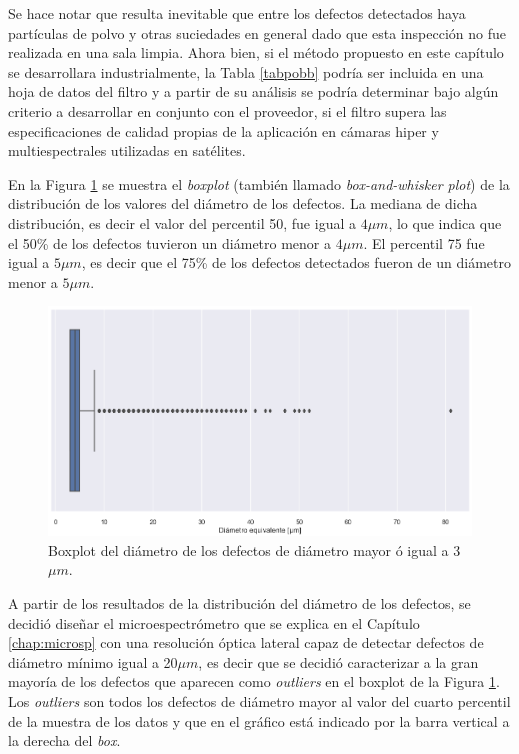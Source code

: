 Se hace notar que resulta inevitable que entre los defectos detectados haya partículas de polvo y otras suciedades en general dado que esta inspección no fue realizada en una sala limpia.  Ahora bien, si el método propuesto en este capítulo se desarrollara industrialmente, la Tabla \ref{tabpobb} podría ser incluida en una hoja de datos del filtro y a partir de su análisis se podría determinar bajo algún criterio a desarrollar en conjunto con el proveedor, si el filtro supera las especificaciones de calidad propias de la aplicación en cámaras hiper y multiespectrales utilizadas en satélites. 

En la Figura \ref{fig:boxpl} se muestra el \textit{boxplot} (también llamado \textit{box-and-whisker plot}) de la distribución de los valores del diámetro de los defectos. La mediana de dicha distribución, es decir el valor del percentil 50, fue igual a $4\mu m$, lo que indica que el 50\% de los defectos tuvieron un diámetro menor a $4 \mu m$. El percentil 75 fue igual a $5 \mu m$, es decir que el 75\% de los defectos detectados fueron de un diámetro menor a $5 \mu m$.

\begin{figure}
\centering
\includegraphics[scale=0.9]{Figs/cuantificaciondefectos/boxplotdefectos.png}
\caption{Boxplot del diámetro de los defectos de diámetro mayor ó igual a 3 $\mu m$.}
\label{fig:boxpl}
\end{figure}

A partir de los resultados de la distribución del diámetro de los defectos, se decidió diseñar el microespectrómetro que se explica en el Capítulo \ref{chap:microsp} con una resolución óptica lateral capaz de detectar defectos de diámetro mínimo igual a 20$\mu m$, es decir que se decidió caracterizar a la gran mayoría de los defectos que aparecen como \textit{outliers} en el boxplot de la Figura \ref{fig:boxpl}. Los \textit{outliers} son todos los defectos de diámetro mayor al valor del cuarto percentil de la muestra de los datos y que en el gráfico está indicado por la barra vertical a la derecha del \textit{box}.

